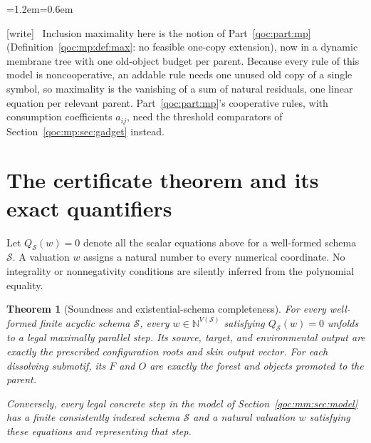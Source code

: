 \documentclass[11pt,letterpaper]{article}
\newtheorem{theorem}{Theorem}[section]
\theoremstyle{definition}
\theoremstyle{remark}
\newcommand{\N}{\mathbb N}
\newcommand{\wtag}{\textup{[write]}}
\newenvironment{writenote}{\par\smallskip\begin{list}{}{\leftmargin=1.2em\rightmargin=0.6em}\item[]\small\wtag\ }{\end{list}\smallskip}
\begin{document}
\begin{writenote}
Inclusion maximality here is the notion of Part~\ref{qoc:part:mp} (Definition~\ref{qoc:mp:def:max}: no feasible one-copy extension), now in a dynamic membrane tree with one old-object budget per parent. Because every rule of this model is noncooperative, an addable rule needs one unused old copy of a single symbol, so maximality is the vanishing of a sum of natural residuals, one linear equation per relevant parent. Part~\ref{qoc:part:mp}'s cooperative rules, with consumption coefficients $a_{ij}$, need the threshold comparators of Section~\ref{qoc:mp:sec:gadget} instead.
\end{writenote}


\section{The certificate theorem and its exact quantifiers}\label{qoc:mm:sec:proof}
Let $Q_{\mathcal S}(w)=0$ denote all the scalar equations above for a well-formed schema $\mathcal S$. A valuation $w$ assigns a natural number to every numerical coordinate. No integrality or nonnegativity conditions are silently inferred from the polynomial equality.

\begin{theorem}[Soundness and existential-schema completeness]\label{qoc:mm:thm:main}
For every well-formed finite acyclic schema $\mathcal S$, every $w\in\N^{V(\mathcal S)}$ satisfying $Q_{\mathcal S}(w)=0$ unfolds to a legal maximally parallel step. Its source, target, and environmental output are exactly the prescribed configuration roots and skin output vector. For each dissolving submotif, its $F$ and $O$ are exactly the forest and objects promoted to the parent.

Conversely, every legal concrete step in the model of Section~\ref{qoc:mm:sec:model} has a finite consistently indexed schema $\mathcal S$ and a natural valuation $w$ satisfying these equations and representing that step.
\end{theorem}
\end{document}
